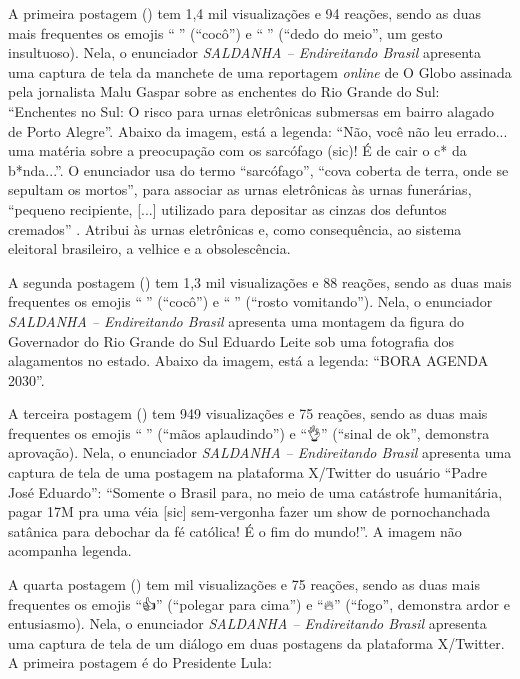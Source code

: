 \documentclass[portuguese]{textolivre}
\begin{document}
A primeira postagem () tem 1,4 mil visualizações e 94 reações, sendo as duas mais frequentes os emojis ``{\Symbola 💩}'' (``cocô'') e ``{\Symbola 🖕}'' (``dedo do meio'', um gesto insultuoso). Nela, o enunciador \emph{SALDANHA -- Endireitando Brasil} apresenta uma captura de tela da manchete de uma reportagem \textit{online} de O Globo assinada pela jornalista Malu Gaspar sobre as enchentes do Rio Grande do Sul: ``Enchentes no Sul: O risco para urnas eletrônicas submersas em bairro alagado de Porto Alegre''. Abaixo da imagem, está a legenda: ``Não, você não leu errado... uma matéria sobre a preocupação com os sarcófago (sic)! É de cair o c* da b*nda...''. O enunciador usa do termo ``sarcófago'', ``cova coberta de terra, onde se sepultam os mortos'', para associar as urnas eletrônicas às urnas funerárias, ``pequeno recipiente, [...] utilizado para depositar as cinzas dos defuntos cremados'' \cite{michaelis2024}. Atribui às urnas eletrônicas e, como consequência, ao sistema eleitoral brasileiro, a velhice e a obsolescência.

A segunda postagem () tem 1,3 mil visualizações e 88 reações, sendo as duas mais frequentes os emojis ``{\Symbola 💩}'' (``cocô'') e ``{\Symbola 🤮}'' (``rosto vomitando''). Nela, o enunciador \emph{SALDANHA -- Endireitando Brasil} apresenta uma montagem da figura do Governador do Rio Grande do Sul Eduardo Leite sob uma fotografia dos alagamentos no estado. Abaixo da imagem, está a legenda: ``BORA AGENDA 2030''.

A terceira postagem () tem 949 visualizações e 75 reações, sendo as duas mais frequentes os emojis ``{\Symbola 👏}'' (``mãos aplaudindo'') e ``{\Symbola 👌}'' (``sinal de ok'', demonstra aprovação). Nela, o enunciador \emph{SALDANHA -- Endireitando Brasil} apresenta uma captura de tela de uma postagem na plataforma X/Twitter do usuário ``Padre José Eduardo'': ``Somente o Brasil para, no meio de uma catástrofe humanitária, pagar 17M pra uma véia [sic] sem-vergonha fazer um show de pornochanchada satânica para debochar da fé católica! É o fim do mundo!''. A imagem não acompanha legenda.

A quarta postagem () tem mil visualizações e 75 reações, sendo as duas mais frequentes os emojis ``{\Symbola 👍}'' (``polegar para cima'') e ``{\Symbola 🔥}'' (``fogo'', demonstra ardor e entusiasmo). Nela, o enunciador \emph{SALDANHA -- Endireitando Brasil} apresenta uma captura de tela de um diálogo em duas postagens da plataforma X/Twitter. A primeira postagem é do Presidente Lula: 
\end{document}
